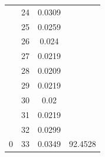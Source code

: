 \documentclass{article}
\begin{document}
\begin{multicols}{2}
\begin{table}[H]
\begin{tabular}{|c|c|c|c|}
 & 24 & 0.0309 &  \\ \cline{2-3}
 & 25 & 0.0259 &  \\ \cline{2-3}
 & 26 & 0.024 &  \\ \cline{2-3}
 & 27 & 0.0219 &  \\ \cline{2-3}
 & 28 & 0.0209 &  \\ \cline{2-3}
 & 29 & 0.0219 &  \\ \cline{2-3}
 & 30 & 0.02 &  \\ \cline{2-3}
 & 31 & 0.0219 &  \\ \cline{2-3}
 & 32 & 0.0299 &  \\ \cline{2-3}
\multirow{-34}{*}{0} & 33 & 0.0349 & \multirow{-21}{*}{92.4528} \\ \hline
\end{tabular}
\end{table}



\end{multicols}
\end{document}
